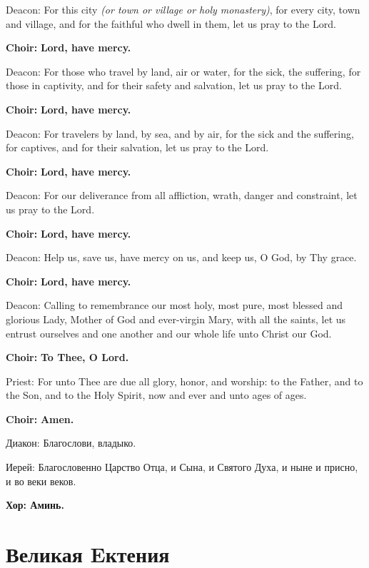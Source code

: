 \documentclass[12pt,a4paper,titlepage]{report}
\begin{document}
\begin{paracol}[1]{2}
	Deacon: For this city \textit{(or town or village or holy monastery)}, for every city, town and village, and for the faithful who dwell in them, let us pray to the Lord.
	
	\textbf{Choir:} \textbf{Lord, have mercy.}
	
	Deacon: For those who travel by land, air or water, for the sick, the suffering, for those in captivity, and for their safety and salvation, let us pray to the Lord.
	
	\textbf{Choir:} \textbf{Lord, have mercy.}
	
	Deacon: For travelers by land, by sea, and by air, for the sick and the suffering, for captives, and for their salvation, let us pray to the Lord.
	
	\textbf{Choir:} \textbf{Lord, have mercy.}
	
	Deacon: For our deliverance from all affliction, wrath, danger and constraint, let us pray to the Lord.
	
	\textbf{Choir:} \textbf{Lord, have mercy.}
	
	Deacon: Help us, save us, have mercy on us, and keep us, O God, by Thy grace.
	
	\textbf{Choir:} \textbf{Lord, have mercy.}
	
	Deacon: Calling to remembrance our most holy, most pure, most blessed and glorious Lady, Mother of God and ever-virgin Mary, with all the saints, let us entrust ourselves and one another and our whole life unto Christ our God.
	
	\textbf{Choir:} \textbf{To Thee, O Lord.}
	
	Priest: For unto Thee are due all glory, honor, and worship: to the Father, and to the Son, and to the Holy Spirit, now and ever and unto ages of ages.
	
	\textbf{Choir:} \textbf{Amen.}
	
	\switchcolumn[1]
	
	Диакон: Благослови, владыко.
	
	Иерей: Благословенно Царство Отца, и Сына, и Святого Духа, и ныне и присно, и во веки веков.
	
	\textbf{Хор: Аминь.}
	
	\section*{Великая Eктения}
	

\end{paracol}
\end{document}
